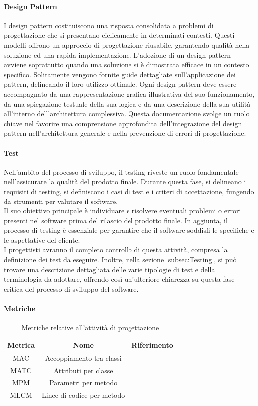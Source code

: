 \paragraph{Design Pattern}
I design pattern costituiscono una risposta consolidata a problemi di progettazione che si presentano ciclicamente in determinati contesti. Questi modelli offrono un approccio di progettazione riusabile, garantendo qualità nella soluzione ed una rapida implementazione.
L'adozione di un design pattern avviene soprattutto quando una soluzione si è dimostrata efficace in un contesto specifico. Solitamente vengono fornite guide dettagliate sull'applicazione dei pattern, delineando il loro utilizzo ottimale.
Ogni design pattern deve essere accompagnato da una rappresentazione grafica illustrativa del suo funzionamento, da una spiegazione testuale della sua logica e da una descrizione della sua utilità all'interno dell'architettura complessiva. Questa documentazione svolge un ruolo chiave nel favorire una comprensione approfondita dell'integrazione del design pattern nell'architettura generale e nella prevenzione di errori di progettazione.

\paragraph{Test}
Nell'ambito del processo di sviluppo, il testing riveste un ruolo fondamentale nell'assicurare la qualità del prodotto finale. Durante questa fase, si delineano i requisiti di testing, si definiscono i casi di test e i criteri di accettazione, fungendo da strumenti per valutare il software. \\
Il suo obiettivo principale è individuare e risolvere eventuali problemi o errori presenti nel software prima del rilascio del prodotto finale. In aggiunta, il processo di testing è essenziale per garantire che il software soddisfi le specifiche e le aspettative del cliente. \\
I progettisti avranno il completo controllo di questa attività, compresa la definizione dei test da eseguire. Inoltre, nella sezione \ref{subsec:Testing}, si può trovare una descrizione dettagliata delle varie tipologie di test e della terminologia da adottare, offrendo così un'ulteriore chiarezza su questa fase critica del processo di sviluppo del software.

\paragraph{Metriche}
\begin{table}[H]
    \centering
    \begin{tabular}{|c|c|c|}
    \hline
    Metrica & Nome & Riferimento \\
    \hline \hline
    MAC & Accoppiamento tra classi &  \\
    MATC & Attributi per classe &  \\
    MPM & Parametri per metodo & \\
    MLCM & Linee di codice per metodo &  \\ 
    \hline
    \end{tabular}
    \caption{Metriche relative all'attività di progettazione}
\end{table}

